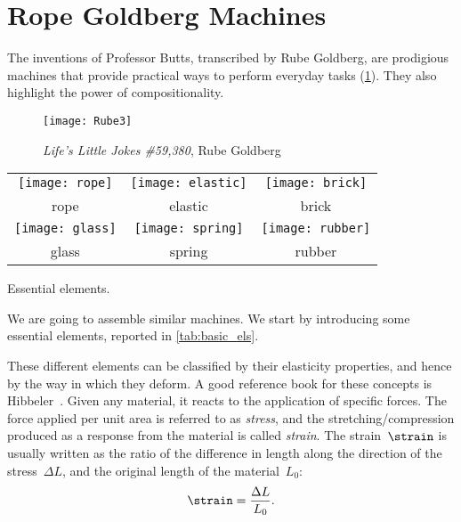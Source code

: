 
\section{Rope Goldberg Machines}

The inventions of Professor Butts, transcribed by Rube Goldberg, are prodigious machines that provide practical ways to perform everyday tasks (\cref{fig:Rube3}).
They also highlight the power of compositionality.

\begin{figure}[h]
    \texttt{[image: Rube3]}
    \caption{\emph{Life’s Little Jokes \#59,380}, Rube Goldberg}
    \label{fig:Rube3}
\end{figure}

\begin{margintable}
    \centering
    \begin{tabular}{ccc}
        \texttt{[image: rope]}    &                  
        \texttt{[image: elastic]} &                  
        \texttt{[image: brick]}                      \\
        rope                                  & elastic & brick  \\[+10pt]
        \texttt{[image: glass]}   &                  
        \texttt{[image: spring]}  &                  
        \texttt{[image: rubber]}                     \\
        glass                                 & spring  & rubber 
    \end{tabular}
    \caption{Essential elements. }
    \label{tab:basic_els}
\end{margintable}

We are going to assemble similar machines.
We start by introducing some essential elements, reported in \cref{tab:basic_els}.

These different elements can be classified by their elasticity properties, and hence by the way in which they deform.
A good reference book for these concepts is Hibbeler~\cite{hibbeler2014mechanics}.
Given any material, it reacts to the application of specific forces.
The force applied per unit area is referred to as \emph{stress}, and the stretching/compression produced as a response from the material is called \emph{strain}.
The strain~$\strain$ is usually written as the ratio of the difference in length along the direction of the stress~$\Delta L$, and the original length of the material~$L_0$:
\begin{equation*}
    \strain = \frac{\Delta L}{L_0}.
\end{equation*}

